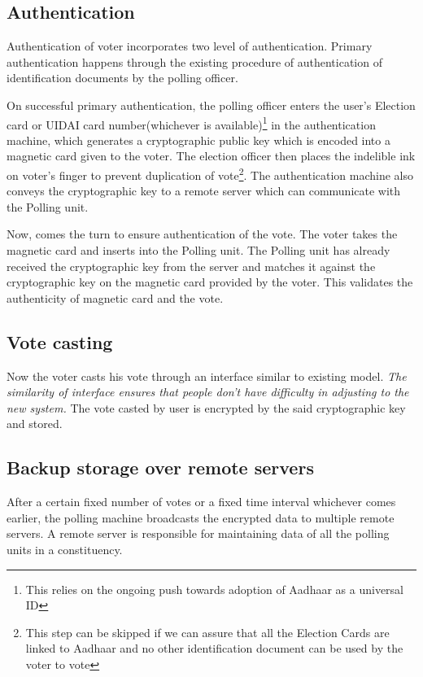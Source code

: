 \documentclass[a4paper,12pt,openany]{book}
\begin{document}
\subsection{Authentication}
Authentication of voter incorporates two level of authentication.
Primary authentication happens through the existing procedure of authentication of identification documents by the polling officer. 

On successful primary authentication, the polling officer enters the user's Election card or UIDAI card number(whichever is available)\footnote{This relies on the ongoing push towards adoption of Aadhaar as a universal ID} in the authentication machine, which generates a cryptographic public key which is encoded into a magnetic card given to the voter. The election officer then places the indelible ink on voter's finger to prevent duplication of vote\footnote{This step can be skipped if we can assure that all the Election Cards are linked to Aadhaar and no other identification document can be used by the voter to vote}. The authentication machine also conveys the cryptographic key to a remote server which can communicate with the Polling unit.

Now, comes the turn to ensure authentication of the vote. The voter takes the magnetic card and inserts into the Polling unit. The Polling unit has already received the cryptographic key from the server and matches it against the cryptographic key on the magnetic card provided by the voter. This validates the authenticity of magnetic card and the vote. 

\subsection{Vote casting}
Now the voter casts his vote through an interface similar to existing model. \emph{ The similarity of interface ensures that people don't have difficulty in adjusting to the new system.} The vote casted by user is encrypted by the said cryptographic key and stored.

\subsection{Backup storage over remote servers}
After a certain fixed number of votes or a fixed time interval whichever comes earlier, the polling machine broadcasts the encrypted data to multiple remote servers. A remote server is responsible for maintaining data of all the polling units in a constituency.
\end{document}
